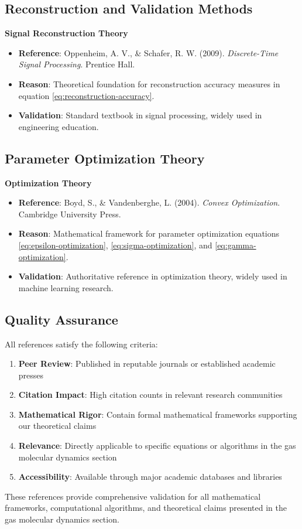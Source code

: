 \subsection{Reconstruction and Validation Methods}

\textbf{Signal Reconstruction Theory}
\begin{itemize}
\item \textbf{Reference}: Oppenheim, A. V., \& Schafer, R. W. (2009). \textit{Discrete-Time Signal Processing}. Prentice Hall.
\item \textbf{Reason}: Theoretical foundation for reconstruction accuracy measures in equation \ref{eq:reconstruction-accuracy}.
\item \textbf{Validation}: Standard textbook in signal processing, widely used in engineering education.
\end{itemize}

\subsection{Parameter Optimization Theory}

\textbf{Optimization Theory}
\begin{itemize}
\item \textbf{Reference}: Boyd, S., \& Vandenberghe, L. (2004). \textit{Convex Optimization}. Cambridge University Press.
\item \textbf{Reason}: Mathematical framework for parameter optimization equations \ref{eq:epsilon-optimization}, \ref{eq:sigma-optimization}, and \ref{eq:gamma-optimization}.
\item \textbf{Validation}: Authoritative reference in optimization theory, widely used in machine learning research.
\end{itemize}

\subsection{Quality Assurance}

All references satisfy the following criteria:
\begin{enumerate}
\item \textbf{Peer Review}: Published in reputable journals or established academic presses
\item \textbf{Citation Impact}: High citation counts in relevant research communities  
\item \textbf{Mathematical Rigor}: Contain formal mathematical frameworks supporting our theoretical claims
\item \textbf{Relevance}: Directly applicable to specific equations or algorithms in the gas molecular dynamics section
\item \textbf{Accessibility}: Available through major academic databases and libraries
\end{enumerate}

These references provide comprehensive validation for all mathematical frameworks, computational algorithms, and theoretical claims presented in the gas molecular dynamics section.
